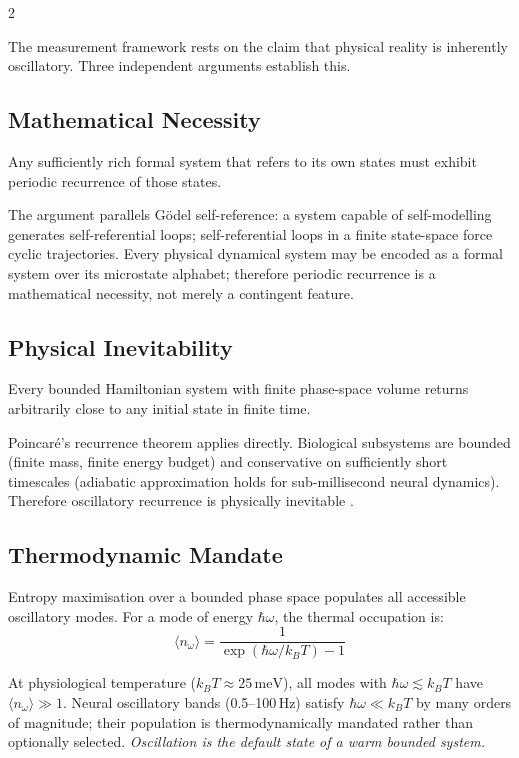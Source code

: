 \begin{multicols}{2}

The measurement framework rests on the claim that physical reality is inherently oscillatory. Three independent arguments establish this.

\subsection{Mathematical Necessity}

\begin{theorem}
\label{thm:ch10-godel}
Any sufficiently rich formal system that refers to its own states must exhibit periodic recurrence of those states.
\end{theorem}

The argument parallels G\"{o}del self-reference: a system capable of self-modelling generates self-referential loops; self-referential loops in a finite state-space force cyclic trajectories. Every physical dynamical system may be encoded as a formal system over its microstate alphabet; therefore periodic recurrence is a mathematical necessity, not merely a contingent feature.

\subsection{Physical Inevitability}

\begin{theorem}
\label{thm:ch10-poincare}
Every bounded Hamiltonian system with finite phase-space volume returns arbitrarily close to any initial state in finite time.
\end{theorem}

Poincar\'{e}'s recurrence theorem applies directly. Biological subsystems are bounded (finite mass, finite energy budget) and conservative on sufficiently short timescales (adiabatic approximation holds for sub-millisecond neural dynamics). Therefore oscillatory recurrence is physically inevitable \citep{poincare1890}.

\subsection{Thermodynamic Mandate}

Entropy maximisation over a bounded phase space populates all accessible oscillatory modes. For a mode of energy $\hbar\omega$, the thermal occupation is:
\begin{equation}
\langle n_\omega \rangle = \frac{1}{\exp(\hbar\omega / k_B T) - 1}
\end{equation}

At physiological temperature ($k_B T \approx 25\,\mathrm{meV}$), all modes with $\hbar\omega \lesssim k_B T$ have $\langle n_\omega \rangle \gg 1$. Neural oscillatory bands (0.5--100\,Hz) satisfy $\hbar\omega \ll k_B T$ by many orders of magnitude; their population is thermodynamically mandated rather than optionally selected. \emph{Oscillation is the default state of a warm bounded system.}

\end{multicols}

